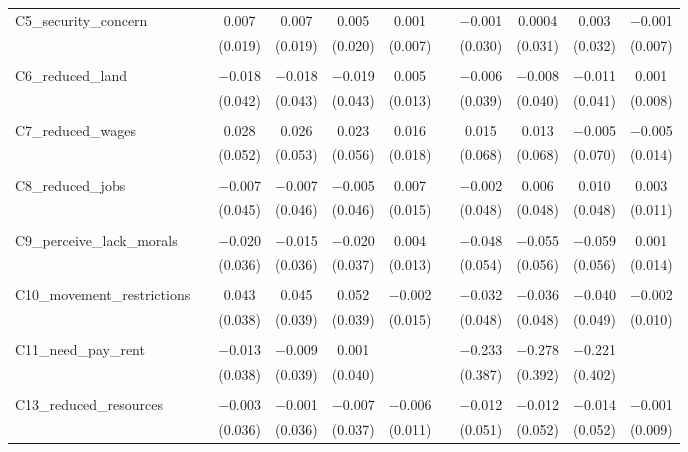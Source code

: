 \begin{table}[H]
\begin{tabular}{@{\extracolsep{4pt}}lcccccccccc}
 C5\_security\_concern &  & 0.007 & 0.007 & 0.005 & 0.001 &  & $-$0.001 & 0.0004 & 0.003 & $-$0.001 \\ 
  &  & (0.019) & (0.019) & (0.020) & (0.007) &  & (0.030) & (0.031) & (0.032) & (0.007) \\ 
  & & & & & & & & & & \\ 
 C6\_reduced\_land &  & $-$0.018 & $-$0.018 & $-$0.019 & 0.005 &  & $-$0.006 & $-$0.008 & $-$0.011 & 0.001 \\ 
  &  & (0.042) & (0.043) & (0.043) & (0.013) &  & (0.039) & (0.040) & (0.041) & (0.008) \\ 
  & & & & & & & & & & \\ 
 C7\_reduced\_wages &  & 0.028 & 0.026 & 0.023 & 0.016 &  & 0.015 & 0.013 & $-$0.005 & $-$0.005 \\ 
  &  & (0.052) & (0.053) & (0.056) & (0.018) &  & (0.068) & (0.068) & (0.070) & (0.014) \\ 
  & & & & & & & & & & \\ 
 C8\_reduced\_jobs &  & $-$0.007 & $-$0.007 & $-$0.005 & 0.007 &  & $-$0.002 & 0.006 & 0.010 & 0.003 \\ 
  &  & (0.045) & (0.046) & (0.046) & (0.015) &  & (0.048) & (0.048) & (0.048) & (0.011) \\ 
  & & & & & & & & & & \\ 
 C9\_perceive\_lack\_morals &  & $-$0.020 & $-$0.015 & $-$0.020 & 0.004 &  & $-$0.048 & $-$0.055 & $-$0.059 & 0.001 \\ 
  &  & (0.036) & (0.036) & (0.037) & (0.013) &  & (0.054) & (0.056) & (0.056) & (0.014) \\ 
  & & & & & & & & & & \\ 
 C10\_movement\_restrictions &  & 0.043 & 0.045 & 0.052 & $-$0.002 &  & $-$0.032 & $-$0.036 & $-$0.040 & $-$0.002 \\ 
  &  & (0.038) & (0.039) & (0.039) & (0.015) &  & (0.048) & (0.048) & (0.049) & (0.010) \\ 
  & & & & & & & & & & \\ 
 C11\_need\_pay\_rent &  & $-$0.013 & $-$0.009 & 0.001 &  &  & $-$0.233 & $-$0.278 & $-$0.221 &  \\ 
  &  & (0.038) & (0.039) & (0.040) &  &  & (0.387) & (0.392) & (0.402) &  \\ 
  & & & & & & & & & & \\ 
 C13\_reduced\_resources &  & $-$0.003 & $-$0.001 & $-$0.007 & $-$0.006 &  & $-$0.012 & $-$0.012 & $-$0.014 & $-$0.001 \\ 
  &  & (0.036) & (0.036) & (0.037) & (0.011) &  & (0.051) & (0.052) & (0.052) & (0.009) \\ 

\end{tabular}
\end{table}

